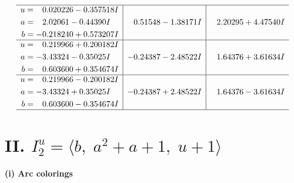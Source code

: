\documentclass[1p]{elsarticle_modified}
\theoremstyle{definition}
\begin{document}
$$\begin{array}{c|c|c}
 \hline 
\begin{aligned}
u &= \phantom{-}0.020226 - 0.357518 I \\
a &= \phantom{-}2.02061 - 0.44390 I \\
b &= -0.218240 + 0.573207 I\end{aligned}
 & \phantom{-}0.51548 - 1.38171 I & \phantom{-}2.20295 + 4.47540 I \\ \hline\begin{aligned}
u &= \phantom{-}0.219966 + 0.200182 I \\
a &= -3.43324 - 0.35025 I \\
b &= \phantom{-}0.603600 + 0.354674 I\end{aligned}
 & -0.24387 - 2.48522 I & \phantom{-}1.64376 + 3.61634 I \\ \hline\begin{aligned}
u &= \phantom{-}0.219966 - 0.200182 I \\
a &= -3.43324 + 0.35025 I \\
b &= \phantom{-}0.603600 - 0.354674 I\end{aligned}
 & -0.24387 + 2.48522 I & \phantom{-}1.64376 - 3.61634 I\\
 \hline 
 \end{array}$$\newpage\newpage\renewcommand{\arraystretch}{1}
\centering \section*{II. $I^u_{2}= \langle b,\;a^2+a+1,\;u+1 \rangle$}
\flushleft \textbf{(i) Arc colorings}\\
\end{document}
